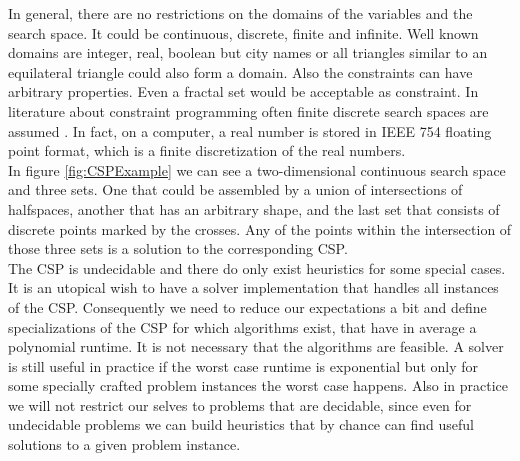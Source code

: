 In general, there are no restrictions on the domains of the variables and the search space. It could be continuous, discrete, finite and infinite. Well known domains are integer, real, boolean but city names or all triangles similar to an equilateral triangle could also form a domain. Also the constraints can have arbitrary properties. Even a fractal set would be acceptable as constraint. In literature about constraint programming often finite discrete search spaces are assumed \cite{Citation Needed}. In fact, on a computer, a real number is stored in IEEE 754 floating point format, which is a finite discretization of the real numbers. \\
In figure \ref{fig:CSPExample} we can see a two-dimensional continuous search space and three sets. One that could be assembled by a union of intersections of halfspaces, another that has an arbitrary shape, and the last set that consists of discrete points marked by the crosses. Any of the points within the intersection of those three sets is a solution to the corresponding CSP.\\
The CSP is undecidable and there do only exist heuristics for some special cases. It is an utopical wish to have a solver implementation that handles all instances of the CSP. Consequently we need to reduce our expectations a bit and define specializations of the CSP for which algorithms exist, that have in average a polynomial runtime. It is not necessary that the algorithms are feasible. A solver is still useful in practice if the worst case runtime is exponential but only for some specially crafted problem instances the worst case happens. Also in practice we will not restrict our selves to problems that are decidable, since even for undecidable problems we can build heuristics that by chance can find useful solutions to a given problem instance.

